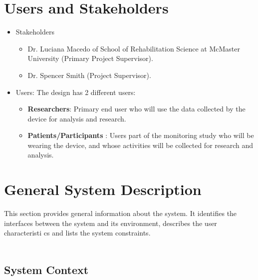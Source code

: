 \documentclass[12pt]{article}
\begin{document}
\section{Users and Stakeholders}
\begin{itemize}
\item Stakeholders

	\begin{itemize}
		\item  Dr. Luciana Macedo of School of Rehabilitation Science at McMaster University (Primary Project Supervisor).
		\item  Dr. Spencer Smith (Project Supervisor).
	\end{itemize}

\item Users: The design has 2 different users:
	\begin{itemize}
		\item \textbf{Researchers}: Primary end user who will use the data collected by the device for analysis and research.
		\item \textbf{Patients/Participants} : Users part of the monitoring study who will be wearing the device, and whose activities will be collected for research and analysis.
	\end{itemize}
\end{itemize}

\section{General System Description}

This section provides general information about the system.  It identifies the
interfaces between the system and its environment, describes the user
characteristi	cs and lists the system constraints.  \\\\
\subsection{System Context}
\end{document}
